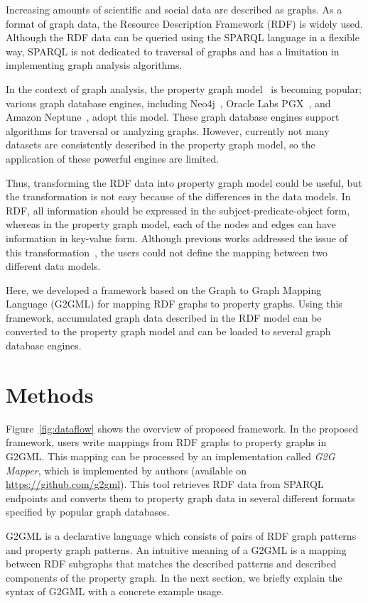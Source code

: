 \documentclass[runningheads]{llncs}
\begin{document}
Increasing amounts of scientific and social data are described as graphs. As a format of graph data, the Resource Description Framework (RDF) is widely used. Although the RDF data can be queried using the SPARQL language in a flexible way, SPARQL is not dedicated to traversal of graphs and has a limitation in implementing graph analysis algorithms.

In the context of graph analysis, the property graph model~\cite{angles} is becoming popular; various graph database engines, including Neo4j~\cite{neo4j}, Oracle Labs PGX~\cite{pgx}, and Amazon Neptune~\cite{neptune}, adopt this model. These graph database engines support algorithms for traversal or analyzing graphs. However, currently not many datasets are consistently described in the property graph model, so the application of these powerful engines are limited.

Thus, transforming the RDF data into property graph model could be useful, but the transformation is not easy because of the differences in the data models. 
In RDF, all information should be expressed in the subject-predicate-object form, whereas in the property graph model, each of the nodes and edges can have information in key-value form. 
Although previous works addressed the issue of this transformation~\cite{hartig},
the users could not define the mapping between two different data models.

Here, we developed a framework based on the Graph to Graph Mapping Language (G2GML) for mapping RDF graphs to property graphs. Using this framework, accumulated graph data described in the RDF model can be converted to the property graph model and can be loaded to several graph database engines. 

\section{Methods}

Figure~\ref{fig:dataflow} shows the overview of proposed framework.
In the proposed framework, users write mappings from RDF graphs to property graphs in G2GML.
This mapping can be processed by an implementation called \textit{G2G Mapper}, which is implemented by authors (available on \url{https://github.com/g2gml}). This tool retrieves RDF data from SPARQL endpoints and converts them to property graph data in several different formats specified by popular graph databases.

G2GML is a declarative language which consists of pairs of RDF graph patterns and property graph patterns. 
An intuitive meaning of a G2GML is a mapping between RDF subgraphs that matches the described patterns and described components of the property graph. In the next section, we briefly explain the syntax of G2GML with a concrete example usage.
\end{document}

